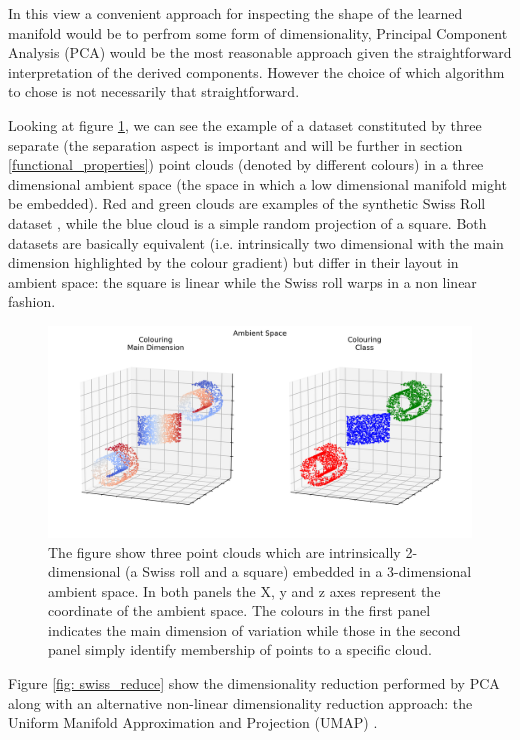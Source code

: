 In this view a convenient approach for inspecting the shape of the learned manifold would be to perfrom some form of dimensionality, Principal Component Analysis (PCA) \cite{pearson1901liii} would be the most reasonable approach given the straightforward interpretation of the derived components. However the choice of which algorithm to chose is not necessarily that straightforward. 

Looking at figure \ref{fig: swiss_ambient}, we can see the example of a dataset constituted by three separate (the separation aspect is important and will be further in section \ref{functional_properties}) point clouds (denoted by different colours) in a three dimensional ambient space (the space in which a low dimensional manifold might be embedded). Red and green clouds are examples of the synthetic Swiss Roll dataset \cite{scikit-learn}, while the blue cloud is a simple random projection of a square. Both datasets are basically equivalent (i.e. intrinsically two dimensional with the main dimension highlighted by the colour gradient) but differ in their layout in ambient space: the square is linear while the Swiss roll warps in a non linear fashion.

\begin{figure}[h]
  \centering
  \includegraphics[width=\textwidth]{images/chapter_4/ambient.png}
    \caption[\textbf{Swiss rolls and square in ambient space}]{The figure show three point clouds which are intrinsically 2-dimensional (a Swiss roll and a square) embedded in a 3-dimensional ambient space. In both panels the X, y and z axes represent the coordinate of the ambient space. The colours in the first panel indicates the main dimension of variation while those in the second panel simply identify membership of points to a specific cloud.}
    \label{fig: swiss_ambient}
\end{figure}

Figure \ref{fig: swiss_reduce} show the dimensionality reduction performed by PCA along with an alternative non-linear dimensionality reduction approach: the Uniform Manifold Approximation and Projection (UMAP) \cite{2018arXivUMAP}. 

